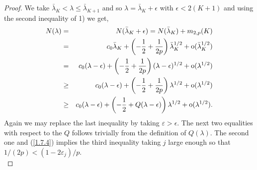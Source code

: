 \documentclass[11pt,a4paper,times]{amsart}
\theoremstyle{plain}
\theoremstyle{definition}
\numberwithin{equation}{section}
\newcommand{\so}{{\rm o}}
\begin{document}
{\begin{proof}
We take $\bar{\lambda}_K<\lambda \leq \bar{\lambda}_{K+1}$ and so $\lambda =\bar{\lambda}_K+\epsilon$ with $\epsilon <2(K+1)$ and using the second inequality of 1) we get, 
 \begin{eqnarray*}
N(\lambda )&=& N(\bar{\lambda}_K+\epsilon) =
N(\bar{\lambda}_K)+m_{2,p}(K)\\
&=&c_0 \bar{\lambda}_K+\left(-\frac{1}{2}+ \frac{1}{2p}\right)\bar{\lambda}^{1/2}_K+ \so(\bar{\lambda}_K^{1/2})\\
&=& c_0(\lambda -\epsilon)+ \left(-\frac{1}{2}+\frac{1}{2p}\right)(\lambda-\epsilon)^{1/2}+ \so(\lambda^{1/2})\\
&\geq &c_0(\lambda -\epsilon)+ \left(-\frac{1}{2}+ \frac{1}{2p}\right)\lambda^{1/2}+ \so(\lambda^{1/2})\\
&\geq & c_0(\lambda -\epsilon)+ \left(-\frac{1}{2}+Q(\lambda-\epsilon)\right)\lambda^{1/2}+ \so(\lambda^{1/2}).
 \end{eqnarray*} 
 Again we may replace the last inequality by taking $\varepsilon >\epsilon$.
%
The next two equalities with respect to the $Q$ follows trivially from the definition of $Q(\lambda)$.
The second one and (\ref{1.7.4}) implies the third inequality taking $j$ large enough so that $1/(2p)< (1-2\varepsilon_j)/p$.\\


\end{proof}}
\end{document}
